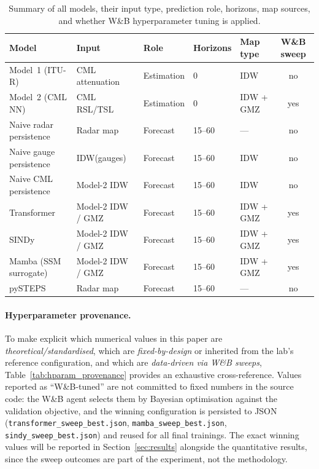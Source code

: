 \documentclass[12pt, a4paper]{article}
\begin{document}
\begin{table}[h]
\centering
\caption{Summary of all models, their input type, prediction role,
horizons, map sources, and whether W\&B hyperparameter tuning is
applied.}
\label{tab:models_summary}
\begin{tabular}{lllllc}
\toprule
Model & Input & Role & Horizons & Map type & W\&B sweep \\
\midrule
Model~1 (ITU-R)            & CML attenuation       & Estimation & 0      & IDW            & no  \\
Model~2 (CML NN)           & CML RSL/TSL           & Estimation & 0      & IDW + GMZ      & yes \\
Naive radar persistence    & Radar map             & Forecast   & 15--60 & ---            & no  \\
Naive gauge persistence    & IDW(gauges)           & Forecast   & 15--60 & IDW            & no  \\
Naive CML persistence      & Model-2 IDW           & Forecast   & 15--60 & IDW            & no  \\
Transformer                & Model-2 IDW / GMZ     & Forecast   & 15--60 & IDW + GMZ      & yes \\
SINDy                      & Model-2 IDW / GMZ     & Forecast   & 15--60 & IDW + GMZ      & yes \\
Mamba (SSM surrogate)      & Model-2 IDW / GMZ     & Forecast   & 15--60 & IDW + GMZ      & yes \\
pySTEPS                    & Radar map             & Forecast   & 15--60 & ---            & no  \\
\bottomrule
\end{tabular}
\end{table}

\paragraph{Hyperparameter provenance.}
To make explicit which numerical values in this paper are
\emph{theoretical/standardised}, which are \emph{fixed-by-design} or
inherited from the lab's reference configuration, and which are
\emph{data-driven via W\&B sweeps}, Table~\ref{tab:hparam_provenance}
provides an exhaustive cross-reference. Values reported as
``W\&B-tuned'' are not committed to fixed numbers in the source code:
the W\&B agent selects them by Bayesian optimisation against the
validation objective, and the winning configuration is persisted to
JSON (\texttt{transformer\_sweep\_best.json},
\texttt{mamba\_sweep\_best.json}, \texttt{sindy\_sweep\_best.json}) and
reused for all final trainings. The exact winning values will be
reported in Section~\ref{sec:results} alongside the quantitative
results, since the sweep outcomes are part of the experiment, not the
methodology.
\end{document}
